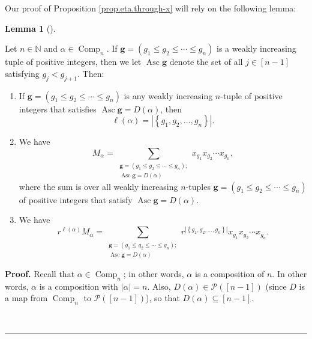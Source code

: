 \documentclass[numbers=enddot,12pt,final,onecolumn,notitlepage]{scrartcl}%
\theoremstyle{definition}
\newtheorem{lem}[theo]{Lemma}
\newenvironment{lemma}[1][]
{\begin{lem}[#1]\begin{leftbar}}
{\end{leftbar}\end{lem}}
\newenvironment{proof}[1][Proof]{\noindent\textbf{#1.} }{\ \rule{0.5em}{0.5em}}
\let\sumnonlimits\sum
\renewcommand{\sum}{\sumnonlimits\limits}
\newenvironment{verlong}{}{}
\begin{document}
\begin{verlong}
Our proof of Proposition \ref{prop.eta.through-x} will rely on the following lemma:

\begin{lemma}
\label{lem.eta.through-x.Mlem}Let $n\in\mathbb{N}$ and $\alpha\in
\operatorname*{Comp}\nolimits_{n}$. If $\mathbf{g}=\left(  g_{1}\leq g_{2}%
\leq\cdots\leq g_{n}\right)  $ is a weakly increasing tuple of positive
integers, then we let $\operatorname*{Asc}\mathbf{g}$ denote the set of all
$j\in\left[  n-1\right]  $ satisfying $g_{j}<g_{j+1}$. Then:

\begin{enumerate}
\item[\textbf{(a)}] If $\mathbf{g}=\left(  g_{1}\leq g_{2}\leq\cdots\leq
g_{n}\right)  $ is any weakly increasing $n$-tuple of positive integers that
satisfies $\operatorname*{Asc}\mathbf{g}=D\left(  \alpha\right)  $, then
\[
\ell\left(  \alpha\right)  =\left\vert \left\{  g_{1},g_{2},\ldots
,g_{n}\right\}  \right\vert .
\]


\item[\textbf{(b)}] We have%
\[
M_{\alpha}=\sum_{\substack{\mathbf{g}=\left(  g_{1}\leq g_{2}\leq\cdots\leq
g_{n}\right)  ;\\\operatorname*{Asc}\mathbf{g}=D\left(  \alpha\right)
}}x_{g_{1}}x_{g_{2}}\cdots x_{g_{n}},
\]
where the sum is over all weakly increasing $n$-tuples $\mathbf{g}=\left(
g_{1}\leq g_{2}\leq\cdots\leq g_{n}\right)  $ of positive integers that
satisfy $\operatorname*{Asc}\mathbf{g}=D\left(  \alpha\right)  $.

\item[\textbf{(c)}] We have%
\[
r^{\ell\left(  \alpha\right)  }M_{\alpha}=\sum_{\substack{\mathbf{g}=\left(
g_{1}\leq g_{2}\leq\cdots\leq g_{n}\right)  ;\\\operatorname*{Asc}%
\mathbf{g}=D\left(  \alpha\right)  }}r^{\left\vert \left\{  g_{1},g_{2}%
,\ldots,g_{n}\right\}  \right\vert }x_{g_{1}}x_{g_{2}}\cdots x_{g_{n}}.
\]

\end{enumerate}
\end{lemma}

\begin{proof}
Recall that $\alpha\in\operatorname*{Comp}\nolimits_{n}$; in other words,
$\alpha$ is a composition of $n$. In other words, $\alpha$ is a composition
with $\left\vert \alpha\right\vert =n$. Also, $D\left(  \alpha\right)
\in\mathcal{P}\left(  \left[  n-1\right]  \right)  $ (since $D$ is a map from
$\operatorname*{Comp}\nolimits_{n}$ to $\mathcal{P}\left(  \left[  n-1\right]
\right)  $), so that $D\left(  \alpha\right)  \subseteq\left[  n-1\right]
$.\medskip


\end{proof}
\end{verlong}
\end{document}
